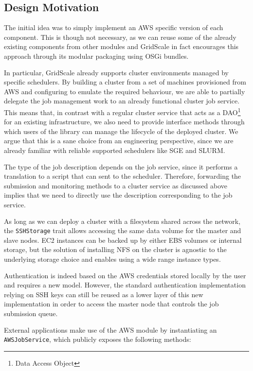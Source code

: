 \subsection{Design Motivation}

The initial idea was to simply implement an AWS specific version of each component. This is though not necessary, as we can reuse some of the already existing components from other modules and GridScale in fact encourages this approach through its modular packaging using OSGi bundles.

In particular, GridScale already supports cluster environments managed by specific schedulers. By building a cluster from a set of machines provisioned from AWS and configuring to emulate the required behaviour, we are able to partially delegate the job management work to an already functional cluster job service. This means that, in contrast with a regular cluster service that acts as a DAO\footnote{Data Access Object} for an existing infrastructure, we also need to provide interface methods through which users of the library can manage the lifecycle of the deployed cluster. We argue that this is a sane choice from an engineering perspective, since we are already familiar with reliable supported schedulers like SGE and SLURM.

The type of the job description depends on the job service, since it performs a translation to a script that can sent to the scheduler. Therefore, forwarding the submission and monitoring methods to a cluster service as discussed above implies that we need to directly use the description corresponding to the job service.

As long as we can deploy a cluster with a filesystem shared across the network, the \verb|SSHStorage| trait allows accessing the same data volume for the master and slave nodes. EC2 instances can be backed up by either EBS volumes or internal storage, but the solution of installing NFS on the cluster is agnostic to the underlying storage choice and enables using a wide range instance types.

Authentication is indeed based on the AWS credentials stored locally by the user and requires a new model. However, the standard authentication implementation relying on SSH keys can still be reused as a lower layer of this new implementation in order to access the master node that controls the job submission queue.

External applications make use of the AWS module by instantiating an \verb|AWSJobService|, which publicly exposes the following methods:

